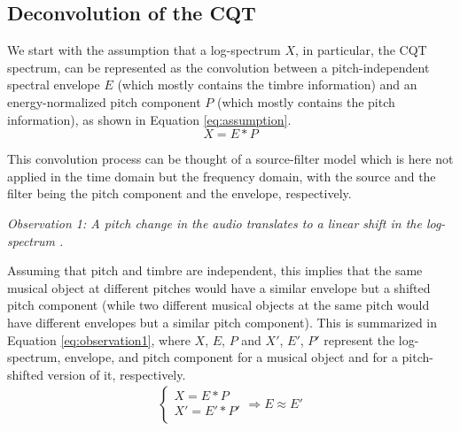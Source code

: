 \documentclass[journal]{IEEEtran}
\begin{document}


\subsection{Deconvolution of the CQT}

We start with the assumption that a log-spectrum $X$, in particular, the CQT spectrum, can be represented as the convolution between a pitch-independent spectral envelope $E$ (which mostly contains the timbre information) and an energy-normalized pitch component $P$ (which mostly contains the pitch information), as shown in Equation \ref{eq:assumption}. 
\begin{equation}
\label{eq:assumption}
X = E * P
\end{equation}

This convolution process can be thought of a source-filter model \cite{fant1970} which is here not applied in the time domain but the frequency domain, with the source and the filter being the pitch component and the envelope, respectively.

\emph{Observation 1: A pitch change in the audio translates to a linear shift in the log-spectrum \cite{brown1991, brown1992}.}

Assuming that pitch and timbre are independent, this implies that the same musical object at different pitches would have a similar envelope but a shifted pitch component (while two different musical objects at the same pitch would have different envelopes but a similar pitch component). This is summarized in Equation \ref{eq:observation1}, where $X$, $E$, $P$ and $X'$, $E'$, $P'$ represent the log-spectrum, envelope, and pitch component for a musical object and for a pitch-shifted version of it, respectively.
\begin{equation}
\label{eq:observation1}
\begin{split}
\begin{cases}
X = E * P \\
X' = E' * P' \\
\end{cases}
\Rightarrow E \approx E'
\end{split}
\end{equation}
\end{document}
